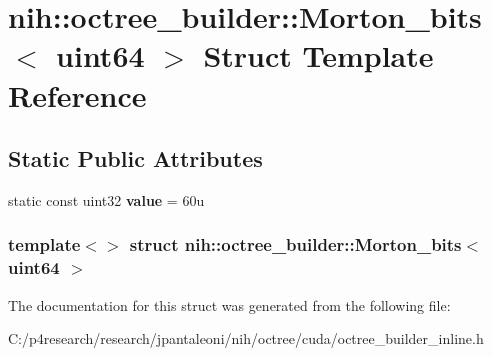 \hypertarget{structnih_1_1octree__builder_1_1_morton__bits_3_01uint64_01_4}{
\section{nih\-:\-:octree\-\_\-builder\-:\-:\-Morton\-\_\-bits$<$ uint64 $>$ \-Struct \-Template \-Reference}
\label{structnih_1_1octree__builder_1_1_morton__bits_3_01uint64_01_4}
}
\subsection*{\-Static \-Public \-Attributes}
\begin{DoxyCompactItemize}
\item 
\hypertarget{structnih_1_1octree__builder_1_1_morton__bits_3_01uint64_01_4_a5c109817d5686c1599287b0037fa81fb}{
static const uint32 {\bfseries value} = 60u}
\label{structnih_1_1octree__builder_1_1_morton__bits_3_01uint64_01_4_a5c109817d5686c1599287b0037fa81fb}

\end{DoxyCompactItemize}
\subsubsection*{template$<$$>$ struct nih\-::octree\-\_\-builder\-::\-Morton\-\_\-bits$<$ uint64 $>$}



\-The documentation for this struct was generated from the following file\-:\begin{DoxyCompactItemize}
\item 
\-C\-:/p4research/research/jpantaleoni/nih/octree/cuda/octree\-\_\-builder\-\_\-inline.\-h\end{DoxyCompactItemize}
